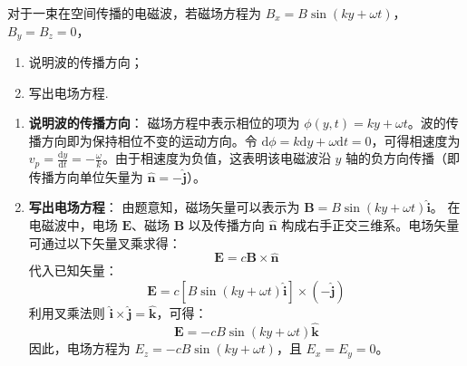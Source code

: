 \begin{exercise}\label{ex:21.4}
对于一束在空间传播的电磁波，若磁场方程为 $B_x = B \sin(k y + \omega t)$，$B_y = B_z = 0$，
\begin{enumerate}
  \item[(a)] 说明波的传播方向；
  \item[(b)] 写出电场方程.
\end{enumerate}
\end{exercise}
\begin{solution}
\begin{enumerate}
    \item[(a)] \textbf{说明波的传播方向}：
    磁场方程中表示相位的项为 $\phi(y, t) = ky + \omega t$。波的传播方向即为保持相位不变的运动方向。令 $\mathrm{d}\phi = k \mathrm{d}y + \omega \mathrm{d}t = 0$，可得相速度为 $v_p = \frac{\mathrm{d}y}{\mathrm{d}t} = -\frac{\omega}{k}$。由于相速度为负值，这表明该电磁波沿 $y$ 轴的负方向传播（即传播方向单位矢量为 $\hat{\boldsymbol{n}} = -\hat{\boldsymbol{j}}$）。

    \item[(b)] \textbf{写出电场方程}：
    由题意知，磁场矢量可以表示为 $\boldsymbol{B} = B \sin(k y + \omega t) \hat{\boldsymbol{i}}$。
    在电磁波中，电场 $\boldsymbol{E}$、磁场 $\boldsymbol{B}$ 以及传播方向 $\hat{\boldsymbol{n}}$ 构成右手正交三维系。电场矢量可通过以下矢量叉乘求得：
    $$ \boldsymbol{E} = c \boldsymbol{B} \times \hat{\boldsymbol{n}} $$
    代入已知矢量：
    $$ \boldsymbol{E} = c \left[ B \sin(k y + \omega t) \hat{\boldsymbol{i}} \right] \times (-\hat{\boldsymbol{j}}) $$
    利用叉乘法则 $\hat{\boldsymbol{i}} \times \hat{\boldsymbol{j}} = \hat{\boldsymbol{k}}$，可得：
    $$ \boldsymbol{E} = -c B \sin(k y + \omega t) \hat{\boldsymbol{k}} $$
    因此，电场方程为 $E_z = -c B \sin(k y + \omega t)$，且 $E_x = E_y = 0$。
\end{enumerate}
\end{solution}


